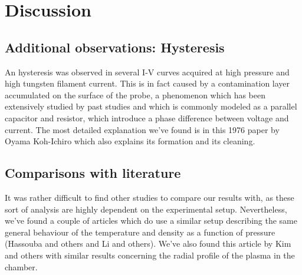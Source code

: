 \section{Discussion}

\subsection{Additional observations: Hysteresis}
An hysteresis was observed in several I-V curves acquired at high pressure and high tungsten filament current.
This is in fact caused by a contamination layer accumulated on the surface of the probe, a phenomenon which has been extensively studied by past studies and which is commonly modeled as a parallel capacitor and resistor, which introduce a phase difference between voltage and current.
The most detailed explanation we've found is in this 1976 paper by Oyama Koh-Ichiro
which also explains its formation and its cleaning.

\subsection{Comparisons with literature}
It was rather difficult to find other studies to compare our results with, as these sort of analysis are highly dependent on the experimental setup.
Nevertheless, we've found a couple of articles which do use a similar setup describing the same general behaviour of the temperature and density as a function of pressure (Hassouba and others and Li and others). 
We've also found this article by Kim and others with similar results concerning the radial profile of the plasma in the chamber.

